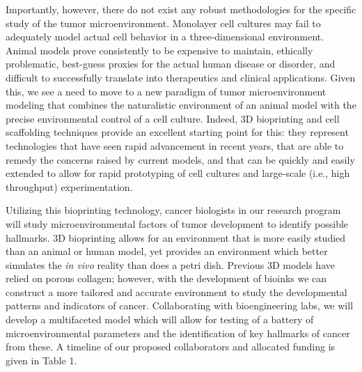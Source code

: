 \documentclass[11pt,letterpaper,final] {article}
\begin{document}
Importantly, however, there do not exist any robust methodologies for the specific study of the tumor microenvironment. Monolayer cell cultures may fail to adequately model actual cell behavior in a three-dimensional environment. Animal models prove consistently to be expensive to maintain, ethically problematic, best-guess proxies for the actual human disease or disorder, and difficult to successfully translate into therapeutics and clinical applications. Given this, we see a need to move to a new paradigm of tumor microenvironment modeling that combines the naturalistic environment of an animal model with the precise environmental control of a cell culture. Indeed, 3D bioprinting and cell scaffolding techniques provide an excellent starting point for this: they represent technologies that have seen rapid advancement in recent years, that are able to remedy the concerns raised by current models, and that can be quickly and easily extended to allow for rapid prototyping of cell cultures and large-scale (i.e., high throughput) experimentation.

Utilizing this bioprinting technology, cancer biologists in our research program will study microenvironmental factors of tumor development to identify possible hallmarks. 3D bioprinting allows for an environment that is more easily studied than an animal or human model, yet provides an environment which better simulates the {\itshape in vivo} reality than does a petri dish. Previous 3D models have relied on porous collagen; however, with the development of bioinks we can construct a more tailored and accurate environment to study the developmental patterns and indicators of cancer. Collaborating with bioengineering labs, we will develop a multifaceted model which will allow for testing of a battery of microenvironmental parameters and the identification of key hallmarks of cancer from these. A timeline of our proposed collaborators and allocated funding is given in Table 1.\\
\end{document}
